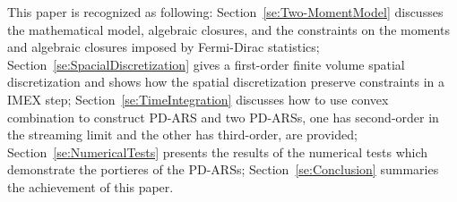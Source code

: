 This paper is recognized as following: Section~\ref{se:Two-MomentModel} discusses the mathematical model, algebraic closures, and the constraints on the moments and algebraic closures imposed by Fermi-Dirac statistics;
Section~\ref{se:SpacialDiscretization} gives a first-order finite volume spatial discretization and shows how the spatial discretization preserve constraints in a IMEX step;
Section~\ref{se:TimeIntegration} discusses how to use convex combination to construct PD-ARS and two PD-ARSs, one has second-order in the streaming limit and the other has third-order, are provided;
Section~\ref{se:NumericalTests} presents the results of the numerical tests which demonstrate the portieres of the PD-ARSs; Section~\ref{se:Conclusion} summaries the achievement of this paper.